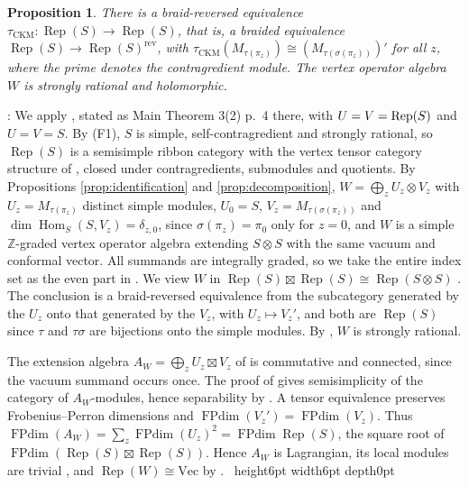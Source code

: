 \documentclass[leqno]{article}
\let\cal\relax
\newcommand{\cal}{\mathcal}
\newcommand{\Z}{\ensuremath{\mathbb{Z}}}
\newcommand{\qed}{\hfill \vrule height6pt  width6pt depth0pt}
\newcommand{\co}{\colon}
\newcommand{\ot}{\otimes}
\DeclareMathOperator{\Rep}{Rep}
\newtheorem{prop}[thm]{Proposition}
\newenvironment{proof}[1][]{\noindent {\it Proof #1} : }{\hbox{~}\qed
\smallskip
}
\numberwithin{equation}{section}
\begin{document}
\begin{prop}
\label{prop:braid-reversal}
There is a braid-reversed equivalence $\tau_{\mathrm{CKM}} \co \Rep(S) \to \Rep(S)$, that is, a braided equivalence $\Rep(S) \to \Rep(S)^{\mathrm{rev}}$, with $\tau_{\mathrm{CKM}}(M_{\tau(\pi_z)}) \cong (M_{\tau(\sigma(\pi_z))})'$ for all $z$, where the prime denotes the contragredient module. The vertex operator algebra $W$ is strongly rational and holomorphic.
\end{prop}

\begin{proof}
We apply \cite[Theorem 5.10(2) p.~51]{CKM22}, stated as Main Theorem 3(2) p.~4 there, with $\cal U = \cal V = \Rep(S)$ and $U = V = S$. By (F1), $S$ is simple, self-contragredient and strongly rational, so $\Rep(S)$ is a semisimple ribbon category with the vertex tensor category structure of \cite{Hua08}, closed under contragredients, submodules and quotients. By Propositions \ref{prop:identification} and \ref{prop:decomposition}, $W = \bigoplus_z U_z \ot V_z$ with $U_z = M_{\tau(\pi_z)}$ distinct simple modules, $U_0 = S$, $V_z = M_{\tau(\sigma(\pi_z))}$ and $\dim\operatorname{Hom}_S(S,V_z) = \delta_{z,0}$, since $\sigma(\pi_z) = \pi_0$ only for $z = 0$, and $W$ is a simple $\Z$-graded vertex operator algebra extending $S \ot S$ with the same vacuum and conformal vector. All summands are integrally graded, so we take the entire index set as the even part in \cite[Theorem 5.10(2)]{CKM22}. We view $W$ in $\Rep(S) \boxtimes \Rep(S) \cong \Rep(S \ot S)$ \cite[Theorems 5.5 p.~48 and 5.7 p.~49]{CKM22}. The conclusion is a braid-reversed equivalence from the subcategory generated by the $U_z$ onto that generated by the $V_z$, with $U_z \mapsto V_z'$, and both are $\Rep(S)$ since $\tau$ and $\tau\sigma$ are bijections onto the simple modules. By \cite[Corollary 5.13 p.~53]{CKM22}, $W$ is strongly rational.

The extension algebra $A_W=\bigoplus_z U_z\boxtimes V_z$ of \cite[Theorem 3.2 p.~10]{HKL15} is commutative and connected, since the vacuum summand occurs once. The proof of \cite[Theorem 5.12 p.~52]{CKM22} gives semisimplicity of the category of $A_W$-modules, hence separability by \cite[Proposition 2.7]{DMNO13}. A tensor equivalence preserves Frobenius--Perron dimensions and $\operatorname{FPdim}(V_z')=\operatorname{FPdim}(V_z)$. Thus $\operatorname{FPdim}(A_W)=\sum_z\operatorname{FPdim}(U_z)^2=\operatorname{FPdim}\Rep(S)$, the square root of $\operatorname{FPdim}(\Rep(S)\boxtimes\Rep(S))$. Hence $A_W$ is Lagrangian, its local modules are trivial \cite[Remark 4.3 p.~16]{DMNO13}, and $\Rep(W) \cong \mathrm{Vec}$ by \cite[Theorem 3.4 p.~16]{HKL15}.
\end{proof}
\end{document}
